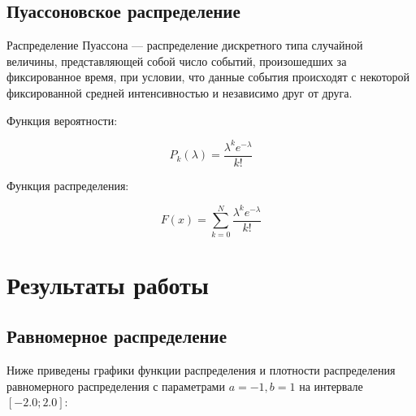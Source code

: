 \documentclass[a4paper,12pt]{article}
\begin{document}
	\subsection*{Пуассоновское распределение}
	
	Распределение Пуассона — распределение дискретного типа случайной величины, представляющей собой число событий, произошедших за фиксированное время, при условии, что данные события происходят с некоторой фиксированной средней интенсивностью и независимо друг от друга.
	
	Функция вероятности:
	
	\[
	P_k(\lambda) = \frac{\lambda^k e^{-\lambda}}{k!}
	\]
	
	Функция распределения:
	
	\[
	F(x) = \sum_{k=0}^{N} \frac{\lambda^k e^{-\lambda}}{k!}
	\]
	
	
	\section*{Результаты работы}
	
	\subsection*{Равномерное распределение}
	
	Ниже приведены графики функции распределения и плотности распределения равномерного распределения с параметрами $a = -1, b = 1$ на интервале $[-2.0; 2.0]$:
	
\end{document}
